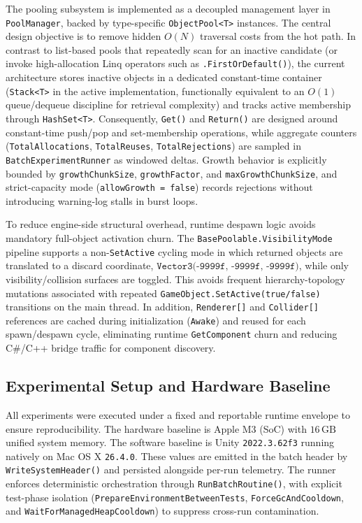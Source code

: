 \documentclass[11pt]{article}
\begin{document}
The pooling subsystem is implemented as a decoupled management layer in \texttt{PoolManager}, backed by type-specific \texttt{ObjectPool<T>} instances. The central design objective is to remove hidden \(O(N)\) traversal costs from the hot path. In contrast to list-based pools that repeatedly scan for an inactive candidate (or invoke high-allocation Linq operators such as \texttt{.FirstOrDefault()}), the current architecture stores inactive objects in a dedicated constant-time container (\texttt{Stack<T>} in the active implementation, functionally equivalent to an \(O(1)\) queue/dequeue discipline for retrieval complexity) and tracks active membership through \texttt{HashSet<T>}. Consequently, \texttt{Get()} and \texttt{Return()} are designed around constant-time push/pop and set-membership operations, while aggregate counters (\texttt{TotalAllocations}, \texttt{TotalReuses}, \texttt{TotalRejections}) are sampled in \texttt{BatchExperimentRunner} as windowed deltas. Growth behavior is explicitly bounded by \texttt{growthChunkSize}, \texttt{growthFactor}, and \texttt{maxGrowthChunkSize}, and strict-capacity mode (\texttt{allowGrowth = false}) records rejections without introducing warning-log stalls in burst loops.

To reduce engine-side structural overhead, runtime despawn logic avoids mandatory full-object activation churn. The \texttt{BasePoolable.VisibilityMode} pipeline supports a non-\texttt{SetActive} cycling mode in which returned objects are translated to a discard coordinate, \(\texttt{Vector3(-9999f, -9999f, -9999f)}\), while only visibility/collision surfaces are toggled. This avoids frequent hierarchy-topology mutations associated with repeated \texttt{GameObject.SetActive(true/false)} transitions on the main thread. In addition, \texttt{Renderer[]} and \texttt{Collider[]} references are cached during initialization (\texttt{Awake}) and reused for each spawn/despawn cycle, eliminating runtime \texttt{GetComponent} churn and reducing C\#/C++ bridge traffic for component discovery.

\subsection{Experimental Setup and Hardware Baseline}

All experiments were executed under a fixed and reportable runtime envelope to ensure reproducibility. The hardware baseline is Apple M3 (SoC) with \(16\,\mathrm{GB}\) unified system memory. The software baseline is Unity \texttt{2022.3.62f3} running natively on Mac OS X \texttt{26.4.0}. These values are emitted in the batch header by \texttt{WriteSystemHeader()} and persisted alongside per-run telemetry. The runner enforces deterministic orchestration through \texttt{RunBatchRoutine()}, with explicit test-phase isolation (\texttt{PrepareEnvironmentBetweenTests}, \texttt{ForceGcAndCooldown}, and \texttt{WaitForManagedHeapCooldown}) to suppress cross-run contamination.
\end{document}
